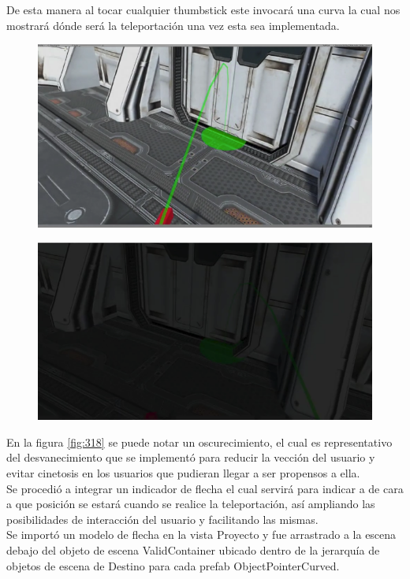 De esta manera al tocar cualquier thumbstick este invocará una curva la cual nos mostrará dónde será la teleportación una vez esta sea implementada.\\
\begin{figure}[H]
	\begin{center}
 		\includegraphics[width = .5\textwidth]{source/images/image35.png}
	\end{center} 
\end{figure}
\begin{figure}[H]
	\begin{center}
 		\includegraphics[width = .5\textwidth]{source/images/image61.png}
	\end{center} 
\end{figure}

En la figura \ref{fig:318} se puede notar un oscurecimiento, el cual es representativo del desvanecimiento que se implementó para reducir la vección del usuario y evitar cinetosis en los usuarios que pudieran llegar a ser propensos a ella.\\

Se procedió a integrar un indicador de flecha el cual servirá para indicar a de cara a que posición se estará cuando se realice la teleportación, así ampliando las posibilidades de interacción del usuario y facilitando las mismas.\\

Se importó un modelo de flecha en la vista Proyecto y fue arrastrado a la escena debajo del objeto de escena ValidContainer ubicado dentro de la jerarquía de objetos de escena de Destino para cada prefab ObjectPointerCurved.\\

